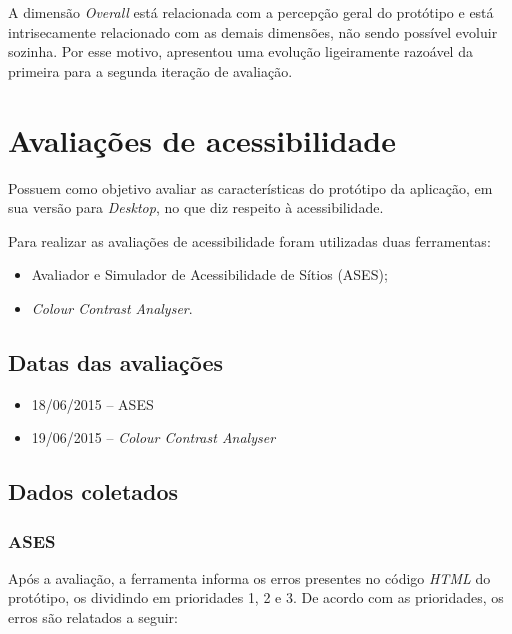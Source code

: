 	A dimensão \textit{Overall} está relacionada com a percepção geral do protótipo e está intrisecamente relacionado com as 
	demais dimensões, não sendo possível evoluir sozinha. Por esse motivo, apresentou uma evolução ligeiramente razoável da primeira
	para a segunda iteração de avaliação.
      
    \pagebreak
    \section{Avaliações de acessibilidade}
     
    Possuem como objetivo avaliar as características do protótipo da aplicação, em sua versão para \textit{Desktop}, no 
    que diz respeito à acessibilidade.
    
    Para realizar as avaliações de acessibilidade foram utilizadas duas ferramentas:

    \begin{itemize}
	\item Avaliador e Simulador de Acessibilidade de Sítios (ASES);
	\item \textit{Colour Contrast Analyser}.
    \end{itemize}
     
    \subsection{Datas das avaliações}

    \begin{itemize}
	\item 18/06/2015 – ASES
	\item 19/06/2015 – \textit{Colour Contrast Analyser}
    \end{itemize}
               
    \subsection{Dados coletados}
    
    \subsubsection{ASES}
        
    Após a avaliação, a ferramenta informa os erros presentes no código \textit{HTML} do
    protótipo, os dividindo em prioridades 1, 2 e 3. De acordo com as prioridades, os erros são 
    relatados a seguir:    
    
